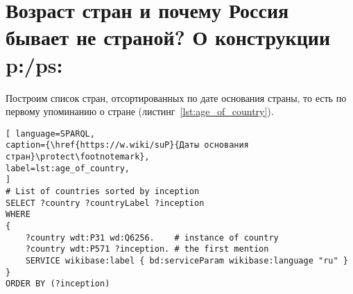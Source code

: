 %
%



\section{Возраст стран и почему Россия бывает не страной? О конструкции p:/ps:}
\label{ch:RussiaNotCountryPPS}



Построим список стран, отсортированных по дате основания страны, то есть по первому упоминанию о стране (листинг~\ref{lst:age_of_country}).

\begin{lstlisting}[ language=SPARQL, 
caption={\href{https://w.wiki/suP}{Даты основания стран}\protect\footnotemark},
label=lst:age_of_country, 
]
# List of countries sorted by inception 
SELECT ?country ?countryLabel ?inception
WHERE
{
	?country wdt:P31 wd:Q6256.    # instance of country
	?country wdt:P571 ?inception. # the first mention
	SERVICE wikibase:label { bd:serviceParam wikibase:language "ru" }
}
ORDER BY (?inception)
\end{lstlisting}

